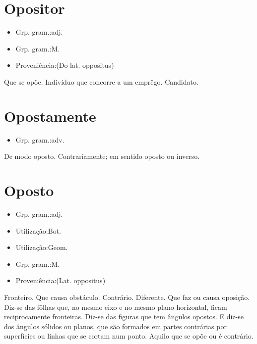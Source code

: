 \section{Opositor}
\begin{itemize}
\item {Grp. gram.:adj.}
\end{itemize}
\begin{itemize}
\item {Grp. gram.:M.}
\end{itemize}
\begin{itemize}
\item {Proveniência:(Do lat. \textunderscore oppositus\textunderscore )}
\end{itemize}
Que se opõe.
Indivíduo que concorre a um emprêgo.
Candidato.
\section{Opostamente}
\begin{itemize}
\item {Grp. gram.:adv.}
\end{itemize}
De modo oposto.
Contrariamente; em sentido oposto ou inverso.
\section{Oposto}
\begin{itemize}
\item {Grp. gram.:adj.}
\end{itemize}
\begin{itemize}
\item {Utilização:Bot.}
\end{itemize}
\begin{itemize}
\item {Utilização:Geom.}
\end{itemize}
\begin{itemize}
\item {Grp. gram.:M.}
\end{itemize}
\begin{itemize}
\item {Proveniência:(Lat. \textunderscore oppositus\textunderscore )}
\end{itemize}
Fronteiro.
Que causa obstáculo.
Contrário.
Diferente.
Que faz ou causa oposição.
Diz-se das fôlhas que, no mesmo eixo e no mesmo plano horizontal, ficam reciprocamente fronteiras.
Diz-se das figuras que tem ângulos opostos.
E diz-se dos ângulos sólidos ou planos, que são formados em partes contrárias por superfícies ou linhas que se cortam num ponto.
Aquilo que se opõe ou é contrário.
